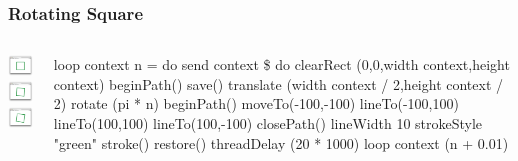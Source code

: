 \documentclass{beamer}
\begin{document}
\begin{frame}[fragile]
\frametitle{Rotating Square}

\begin{columns}
\begin{column}{0.3\textwidth}
\includegraphics[trim = 25mm 30mm 25mm 25mm, clip, width=90pt]{1.png}\\
\includegraphics[trim = 25mm 30mm 25mm 25mm, clip, width=90pt]{3.png}\\
\includegraphics[trim = 25mm 30mm 25mm 25mm, clip, width=90pt]{5.png}
\end{column}
\begin{column}{0.7\textwidth}
\begin{codeblock}[0.8]
\tiny
\begin{semiverbatim}
loop context n = do
    send context \$ do
        clearRect (0,0,width context,height context)
        beginPath()
        save()
        translate (width context / 2,height context / 2)
        rotate (pi * n)
        beginPath()
        moveTo(-100,-100)
        lineTo(-100,100)
        lineTo(100,100)
        lineTo(100,-100)
        closePath()
        lineWidth 10
        strokeStyle "green"
        stroke()
        restore()
    threadDelay (20 * 1000) 
    loop context (n + 0.01)
\end{semiverbatim}
\end{codeblock}
\end{column}
\end{columns}


\end{frame}
\end{document}

